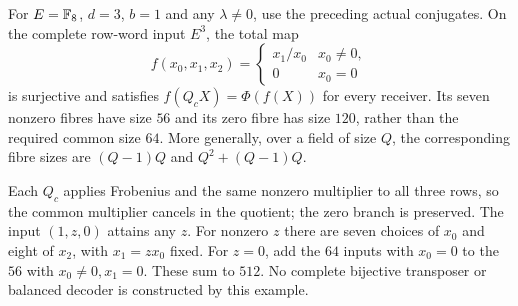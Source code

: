 \begin{example}\label{ex:ratio-unbalanced}
For $E=\mathbb{F}_8$, $d=3$, $b=1$ and any $\lambda\ne0$, use the preceding
actual conjugates. On the complete row-word input $E^3$, the total map
\[
 f(x_0,x_1,x_2)=
 \begin{cases}x_1/x_0&x_0\ne0,\\0&x_0=0\end{cases}
\]
is surjective and satisfies $f(Q_cX)=\Phi(f(X))$ for every receiver.
Its seven nonzero fibres have size $56$ and its zero fibre has size $120$,
rather than the required common size $64$. More generally, over a field
of size $Q$, the corresponding fibre sizes are $(Q-1)Q$ and
$Q^2+(Q-1)Q$.
\end{example}
\begin{outline}
Each $Q_c$ applies Frobenius and the same nonzero multiplier to all three
rows, so the common multiplier cancels in the quotient; the zero branch
is preserved. The input $(1,z,0)$ attains any $z$. For nonzero $z$ there
are seven choices of $x_0$ and eight of $x_2$, with $x_1=zx_0$ fixed.
For $z=0$, add the $64$ inputs with $x_0=0$ to the $56$ with
$x_0\ne0,x_1=0$. These sum to $512$. No complete bijective transposer
or balanced decoder is constructed by this example.
\end{outline}

